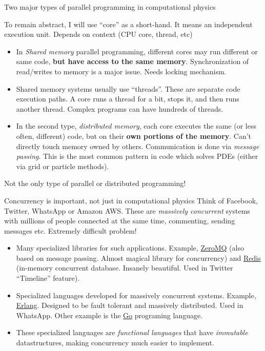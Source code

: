 \documentclass[aspectratio=169]{beamer}
\newcommand{\mypause}{\pause}
\begin{document}
\begin{frame}{Two major types of parallel programming in computational
    physics}

  To remain abstract, I will use ``core'' as a short-hand. It means an
  independent execution unit. Depends on context (CPU core, thread,
  etc)
  \begin{itemize}
  \item In \emph{Shared memory} parallel programming, different cores
    may run different or same code, {\bf but have access to the same
      memory}. Synchronization of read/writes to memory is a major
    issue. Needs locking mechanism.
  \item Shared memory systems usually use ``threads''. These are
    separate code execution paths. A core runs a thread for a bit,
    stops it, and then runs another thread. Complex programs can have
    hundreds of threads. %
    \mypause%
  \item In the second type, \emph{distributed memory}, each core
    executes the same (or less often, different) code, but on their
    {\bf own portions of the memory}. Can't directly touch memory
    owned by others. Communication is done via \emph{message
      passing}. This is the most common pattern in code which solves
    PDEs (either via grid or particle methods).
  \end{itemize}
  Not the only type of parallel or distributed programming!
\end{frame}

\begin{frame}{Concurrency is important, not just in computational physics}
  Think of Facebook, Twitter, WhatsApp or Amazon AWS. These are
  \emph{massively concurrent} systems with millions of people
  connected at the same time, commenting, sending messages
  etc. Extremely difficult problem!%
  \mypause%
  \begin{itemize}
  \item Many specialized libraries for such applications. Example,
    \href{https://zeromq.org}{ZeroMQ} (also based on message
    passing. Almost magical library for concurrency) and
    \href{https://redis.io}{Redis} (in-memory concurrent
    database. Insanely beautiful. Used in Twitter ``Timeline''
    feature).%
    \mypause%
  \item Specialized languages developed for massively concurrent
    systems. Example, \href{https://www.erlang.org}{Erlang}. Designed
    to be fault tolerant and massively distributed. Used in
    WhatsApp. Other example is the \href{https://golang.org}{Go}
    programing language.
  \item These specialized languages are \emph{functional languages}
    that have \emph{immutable} datastructures, making concurrency much
    easier to implement.
  \end{itemize}
  
\end{frame}
\end{document}
